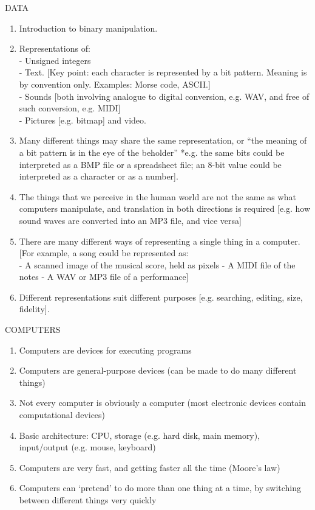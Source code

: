 \begin{enumerate}
DATA
\begin{enumerate}
\item Introduction to binary manipulation.
\item Representations of:\\
- Unsigned integers\\
- Text. [Key point: each character is represented by a bit pattern. Meaning is
by convention only. Examples: Morse code, ASCII.]\\
- Sounds [both involving analogue to digital conversion, e.g. WAV, and free of
such conversion, e.g. MIDI]\\
- Pictures [e.g. bitmap] and video.
\item Many different things may share the same representation, or “the meaning of a bit
pattern is in the eye of the beholder” *e.g. the same bits could be interpreted as a
BMP file or a spreadsheet file; an 8-bit value could be interpreted as a character or
as a number].
\item The things that we perceive in the human world are not the same as what computers
manipulate, and translation in both directions is required [e.g. how sound waves are
converted into an MP3 file, and vice versa]
\item There are many different ways of representing a single thing in a computer. [For
example, a song could be represented as:\\
- A scanned image of the musical score, held as pixels
- A MIDI file of the notes
- A WAV or MP3 file of a performance]
\item Different representations suit different purposes [e.g. searching, editing, size,
fidelity].
\end{enumerate}

COMPUTERS
\begin{enumerate}
\item Computers are devices for executing programs
\item Computers are general-purpose devices (can be made to do many different things)
\item Not every computer is obviously a computer (most electronic devices contain
computational devices)
\item Basic architecture: CPU, storage (e.g. hard disk, main memory), input/output (e.g.
mouse, keyboard)
\item Computers are very fast, and getting faster all the time (Moore’s law)
\item Computers can ‘pretend’ to do more than one thing at a time, by switching between
different things very quickly
\end{enumerate}


\end{enumerate}
